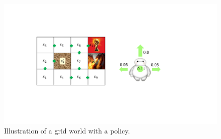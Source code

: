 \documentclass[11pt,letter,notitlepage]{article}
\begin{document}
\begin{figure}[h]
	\centering
	\includegraphics[width=.8\textwidth]{images/Grid_World}
	\caption{Illustration of a grid world with a policy.}\label{fig:gridworld}
\end{figure}
\end{document}

